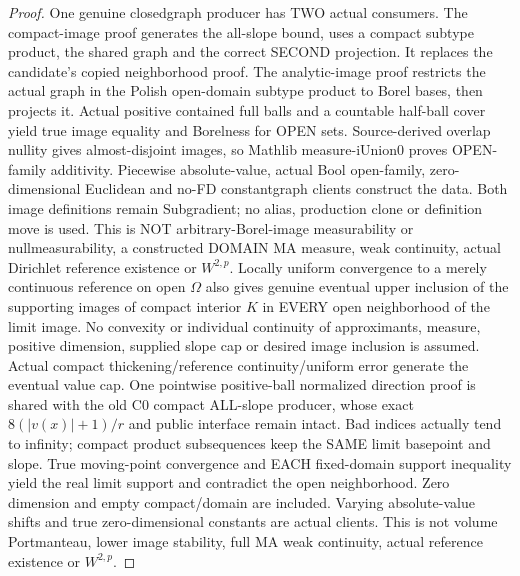 \begin{proof}
  \leanok
  One genuine closedgraph producer has TWO actual consumers. The compact-image
  proof generates the all-slope bound, uses a compact subtype product, the shared
  graph and the correct SECOND projection. It replaces the candidate's copied
  neighborhood proof. The analytic-image proof restricts the actual graph in
  the Polish open-domain subtype product to Borel bases, then projects it.
  Actual positive contained full balls and a countable half-ball cover yield
  true image equality and Borelness for OPEN sets. Source-derived overlap
  nullity gives almost-disjoint images, so Mathlib measure-iUnion0 proves
  OPEN-family additivity. Piecewise absolute-value, actual Bool open-family,
  zero-dimensional Euclidean and no-FD constantgraph clients construct the
  data. Both image definitions remain Subgradient; no alias, production clone
  or definition move is used. This is NOT arbitrary-Borel-image measurability
  or nullmeasurability, a constructed DOMAIN MA measure, weak continuity,
  actual Dirichlet reference existence or $W^{2,p}$.
  Locally uniform convergence to a merely continuous reference on open
  $\Omega$ also gives genuine eventual upper inclusion of the supporting
  images of compact interior $K$ in EVERY open neighborhood of the limit
  image. No convexity or individual continuity of approximants, measure,
  positive dimension, supplied slope cap or desired image inclusion is
  assumed. Actual compact thickening/reference continuity/uniform error
  generate the eventual value cap. One pointwise positive-ball normalized
  direction proof is shared with the old C0 compact ALL-slope producer,
  whose exact $8(|v(x)|+1)/r$ and public interface remain intact.
  Bad indices actually tend to infinity; compact product subsequences keep
  the SAME limit basepoint and slope. True moving-point convergence and
  EACH fixed-domain support inequality yield the real limit support and
  contradict the open neighborhood. Zero dimension and empty compact/domain
  are included. Varying absolute-value shifts and true zero-dimensional
  constants are actual clients. This is not volume Portmanteau, lower image
  stability, full MA weak continuity, actual reference existence or $W^{2,p}$.
\end{proof}

